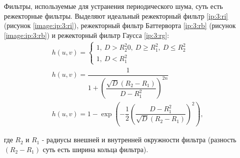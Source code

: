 \begin{itemize}
	Фильтры, используемые для устранения периодического шума, суть есть режекторные фильтры. Выделяют идеальный режекторный фильтр \eqref{ip:3:ri} (рисунок \ref{image:ip:3:ri}), режекторный фильтр Баттерворта \eqref{ip:3:rb} (рисунок \ref{image:ip:3:rb}) и режекторный фильтр Гаусса \eqref{ip:3:rg}: %
	\begin{gather}
		\label{ip:3:ri} h(u, v) =
		\begin{cases}
			1 ,~ D > R_2  ^ 2
			0 ,~ D \ge R_1 ^ 2 ,~ D \le R_2 ^ 2\\
			1 ,~ D < R_1 ^ 2
		\end{cases} \\
		\label{ip:3:rb} h(u, v) = \dfrac{1}{1 + \left (\dfrac{\sqrt{D} (R_2 - R_1)}{D - R_1 ^ 2} \right )^{2n}} \\
		\label{ip:3:rg} h(u, v) = 1 - \exp \left (- \dfrac{1}{2}(\dfrac{D - R_1 ^ 2}{\sqrt{D} (R_2 - R_1)}) ^ 2 \right ),
	\end{gather}

	где $R_2$ и $R_1$ - радиусы внешней и внутренней окружности фильтра (разность $(R_2 - R_1)$ суть есть ширина кольца фильтра).

\def\Runo{2}
\def\Rduo{4}

\noindent
{}
\mimageend

\noindent
{}
\mimageend

%
%
%
%	

\end{itemize}

